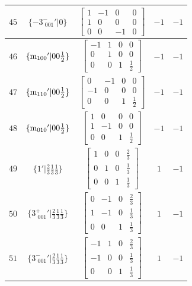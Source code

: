 \documentclass[fleqn,8pt]{jsarticle}
\begin{document}
\begin{longtable}{ccccc}
$ 45 $ & $ \{-3^{-}_{\,\,001}{}'|0\} $ & $ \begin{bmatrix} 1 & -1 & 0 & 0 \\ 1 & 0 & 0 & 0 \\ 0 & 0 & -1 & 0 \end{bmatrix} $ & $ -1 $ & $ -1 $ \\ \hline
$ 46 $ & $ \{{\rm m}_{100}{}'|0 0 \frac{1}{2}\} $ & $ \begin{bmatrix} -1 & 1 & 0 & 0 \\ 0 & 1 & 0 & 0 \\ 0 & 0 & 1 & \frac{1}{2} \end{bmatrix} $ & $ -1 $ & $ -1 $ \\ \hline
$ 47 $ & $ \{{\rm m}_{110}{}'|0 0 \frac{1}{2}\} $ & $ \begin{bmatrix} 0 & -1 & 0 & 0 \\ -1 & 0 & 0 & 0 \\ 0 & 0 & 1 & \frac{1}{2} \end{bmatrix} $ & $ -1 $ & $ -1 $ \\ \hline
$ 48 $ & $ \{{\rm m}_{010}{}'|0 0 \frac{1}{2}\} $ & $ \begin{bmatrix} 1 & 0 & 0 & 0 \\ 1 & -1 & 0 & 0 \\ 0 & 0 & 1 & \frac{1}{2} \end{bmatrix} $ & $ -1 $ & $ -1 $ \\ \hline
$ 49 $ & $ \{1{}'|\frac{2}{3} \frac{1}{3} \frac{1}{3}\} $ & $ \begin{bmatrix} 1 & 0 & 0 & \frac{2}{3} \\ 0 & 1 & 0 & \frac{1}{3} \\ 0 & 0 & 1 & \frac{1}{3} \end{bmatrix} $ & $ 1 $ & $ -1 $ \\ \hline
$ 50 $ & $ \{3^{+}_{\,\,001}{}'|\frac{2}{3} \frac{1}{3} \frac{1}{3}\} $ & $ \begin{bmatrix} 0 & -1 & 0 & \frac{2}{3} \\ 1 & -1 & 0 & \frac{1}{3} \\ 0 & 0 & 1 & \frac{1}{3} \end{bmatrix} $ & $ 1 $ & $ -1 $ \\ \hline
$ 51 $ & $ \{3^{-}_{\,\,001}{}'|\frac{2}{3} \frac{1}{3} \frac{1}{3}\} $ & $ \begin{bmatrix} -1 & 1 & 0 & \frac{2}{3} \\ -1 & 0 & 0 & \frac{1}{3} \\ 0 & 0 & 1 & \frac{1}{3} \end{bmatrix} $ & $ 1 $ & $ -1 $ \\ \hline

\end{longtable}
\end{document}
